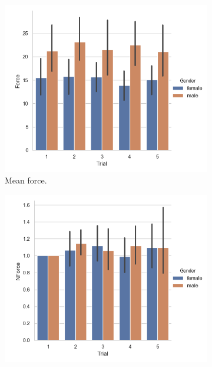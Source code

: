 \begin{figure}[H]
     \hspace{-10mm}
     \begin{subfigure}[b]{0.3\textwidth}
\centering
     \includegraphics[scale=0.4]{Files/Plots/force_mean_by_trial_gen.png}
         \caption{Mean force.}
     \label{fig:forceMeanTrialGen}
     \end{subfigure}
    \hspace{7mm}
     \begin{subfigure}[b]{0.3\textwidth}
         \centering
     \includegraphics[scale=0.4]{Files/Plots/forceNforce_mean_by_trial_gen.png}

\end{subfigure}
\end{figure}
